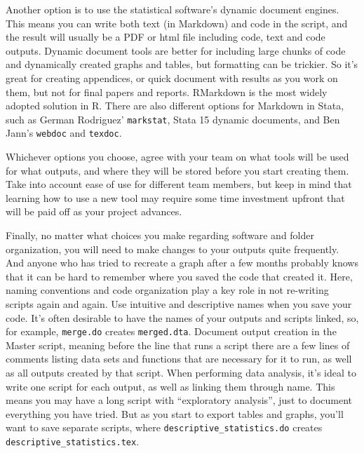 Another option is to use the statistical software's dynamic document engines.
This means you can write both text (in Markdown) and code in the script,
and the result will usually be a PDF or html file including code,
text and code outputs.
Dynamic document tools are better for including large chunks of code and dynamically created graphs and tables,
but formatting can be trickier.
So it's great for creating appendices,
or quick document with results as you work on them,
but not for final papers and reports.
RMarkdown is the most widely adopted solution in R.
There are also different options for Markdown in Stata,
such as German Rodriguez' \texttt{markstat},
Stata 15 dynamic documents,
and Ben Jann's \texttt{webdoc} and
\texttt{texdoc}.

Whichever options you choose,
agree with your team on what tools will be used for what outputs, and
where they will be stored before you start creating them.
Take into account ease of use for different team members, but
keep in mind that learning how to use a new tool may require some
time investment upfront that will be paid off as your project advances.

Finally, no matter what choices you make regarding software and folder organization,
you will need to make changes to your outputs quite frequently.
And anyone who has tried to recreate a graph after a few months probably knows
that it can be hard to remember where you saved the code that created it.
Here, naming conventions and code organization play a key role in not re-writing scripts again and again.
Use intuitive and descriptive names when you save your code.
It's often desirable to have the names of your outputs and scripts linked,
so, for example, \texttt{merge.do} creates \texttt{merged.dta}.
Document output creation in the Master script,
meaning before the line that runs a script there are a few lines of comments listing
data sets and functions that are necessary for it to run,
as well as all outputs created by that script.
When performing data analysis,
it's ideal to write one script for each output,
as well as linking them through name.
This means you may have a long script with ``exploratory analysis'',
just to document everything you have tried.
But as you start to export tables and graphs,
you'll want to save separate scripts, where
\texttt{descriptive\_statistics.do} creates \texttt{descriptive\_statistics.tex}.

